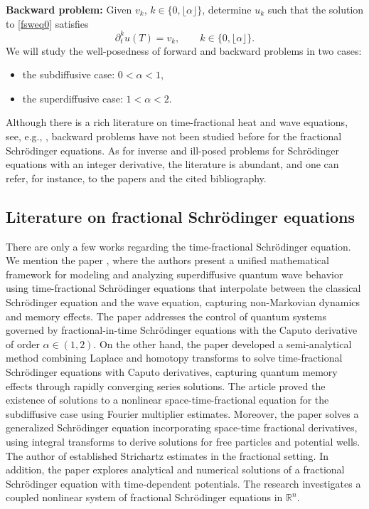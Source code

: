 \documentclass[reqno]{amsart}
\numberwithin{equation}{section}
\begin{document}
\noindent\textbf{Backward problem:} Given $v_k$, $k\in \{0, \lfloor\alpha\rfloor\}$, determine $u_k$ such that the solution to \eqref{fsweq0} satisfies
$$\partial_t^k u(T)=v_k, \qquad k\in \{0, \lfloor\alpha\rfloor\}.$$
We will study the well-posedness of forward and backward problems in two cases:
\begin{itemize}
    \item the subdiffusive case: $0<\alpha<1$,
    \item the superdiffusive case: $1<\alpha<2$.
\end{itemize}

Although there is a rich literature on time-fractional heat and wave equations, see, e.g., \cite{Ce25,Ch25,Ch24,FY20,Hao19}, backward problems have not been studied before for the fractional Schrödinger equations. As for inverse and ill-posed problems for Schrödinger equations with an integer derivative, the literature is abundant, and one can refer, for instance, to the papers \cite{AM12, BP02, CHM25, IY24} and the cited bibliography.

\subsection*{Literature on fractional Schrödinger equations}
There are only a few works regarding the time-fractional Schrödinger equation. We mention the paper \cite{CC23}, where the authors present a unified mathematical framework for modeling and analyzing superdiffusive quantum wave behavior using time-fractional Schrödinger equations that interpolate between the classical Schrödinger equation and the wave equation, capturing non-Markovian dynamics and memory effects. The paper \cite{CC24} addresses the control of quantum systems governed by fractional-in-time Schrödinger equations with the Caputo derivative of order $\alpha\in (1,2)$. On the other hand, the paper \cite{ramswroop14} developed a semi-analytical method combining Laplace and homotopy transforms to solve time-fractional Schrödinger equations with Caputo derivatives, capturing quantum memory effects through rapidly converging series solutions. The article \cite{Gr19} proved the existence of solutions to a nonlinear space-time-fractional equation for the subdiffusive case using Fourier multiplier estimates. Moreover, the paper \cite{Wang07} solves a generalized Schrödinger equation incorporating space-time fractional derivatives, using integral transforms to derive solutions for free particles and potential wells. The author of \cite{Lee20} established Strichartz estimates in the fractional setting. In addition, the paper \cite{Gab23} explores analytical and numerical solutions of a fractional Schrödinger equation with time-dependent potentials. The research \cite{Ba24} investigates a coupled nonlinear system of fractional Schrödinger equations in $\mathbb{R}^n$.
\end{document}
